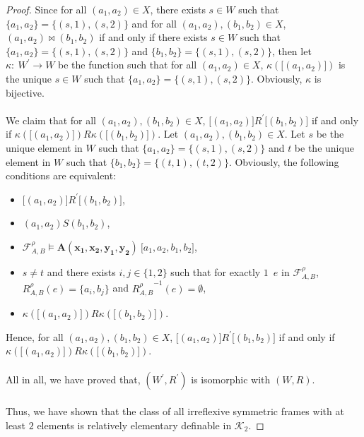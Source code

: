 \documentclass[10pt,a4paper]{amsart}
\begin{document}
\begin{proof}
%
%
Since for all $(a_{1},a_{2}){\in}X$, there exists $s{\in}W$ such that $\{a_{1},a_{2}\}{=}\{(s,1),(s,2)\}$ and for all $(a_{1},a_{2}),(b_{1},b_{2}){\in}X$, $(a_{1},a_{2}){\bowtie}(b_{1},b_{2})$ if and only if there exists $s{\in}W$ such that $\{a_{1},a_{2}\}{=}\{(s,1),(s,2)\}$ and $\{b_{1},b_{2}\}{=}\{(s,1),(s,2)\}$, then let $\kappa:\ W^{\prime}{\longrightarrow}W$ be the function such that for all $(a_{1},a_{2}){\in}X$, $\kappa(\lbrack(a_{1},a_{2})\rbrack)$ is the unique $s{\in}W$ such that $\{a_{1},a_{2}\}{=}\{(s,1),(s,2)\}$.
Obviously, $\kappa$ is bijective.
%
\\
\\
%
%
We claim that for all $(a_{1},a_{2}),(b_{1},b_{2}){\in}X$, $\lbrack(a_{1},a_{2})\rbrack{R^{\prime}}\lbrack(b_{1},b_{2})\rbrack$ if and only if $\kappa(\lbrack(a_{1},a_{2})\rbrack){R}\kappa(\lbrack(b_{1},b_{2})\rbrack)$.
Let $(a_{1},a_{2}),(b_{1},b_{2}){\in}X$.
Let $s$ be the unique element in $W$ such that $\{a_{1},a_{2}\}{=}\{(s,1),(s,2)\}$ and $t$ be the unique element in $W$ such that $\{b_{1},b_{2}\}{=}\{(t,1),(t,2)\}$.
Obviously, the following conditions are equivalent:
%
%
\begin{itemize}
%
%
\item $\lbrack(a_{1},a_{2})\rbrack{R^{\prime}}\lbrack(b_{1},b_{2})\rbrack$,
%
%
\item $(a_{1},a_{2}){S}(b_{1},b_{2})$,
%
%
\item ${\mathcal F}^{\rho}_{A,B}{\models}\mathbf{A}(\mathbf{x_{1}},\mathbf{x_{2}},\mathbf{y_{1}},\mathbf{y_{2}})\ \lbrack a_{1},a_{2},b_{1},b_{2}\rbrack$,
%
%
\item $s{\not=}t$ and there exists $i,j{\in}\{1,2\}$ such that for exactly $1$~$e$ in ${\mathcal F}_{A,B}^{\rho}$, $R_{A,B}^{\rho}(e){=}
%
%
%
%
%
%
%
%
%
%
%
%
$\linebreak$
%
%
%
%
%
%
%
%
%
%
%
%
\{a_{i},b_{j}\}$ and ${R_{A,B}^{\rho}}^{{-}1}(e){=}\emptyset$,
%
%
\item $\kappa(\lbrack(a_{1},a_{2})\rbrack){R}\kappa(\lbrack(b_{1},b_{2})\rbrack)$.
%
%
\end{itemize}
%
%
Hence, for all $(a_{1},a_{2}),(b_{1},b_{2}){\in}X$, $\lbrack(a_{1},a_{2})\rbrack{R^{\prime}}\lbrack(b_{1},b_{2})\rbrack$ if and only if $\kappa(\lbrack(a_{1},a_{2})\rbrack){R}
%
%
%
%
%
%
%
%
%
%
%
%
$\linebreak$
%
%
%
%
%
%
%
%
%
%
%
%
\kappa(\lbrack(b_{1},b_{2})\rbrack)$.
%
%
\\
\\
%
%
All in all, we have proved that, $(W^{\prime},R^{\prime})$ is isomorphic with $(W,R)$.
%
%
\\
\\
%
%
Thus, we have shown that the class of all irreflexive symmetric frames with at least $2$ elements is relatively elementary definable in ${\mathcal K}_{2}$.
%
%
\medskip
%
%
\end{proof}
\end{document}

